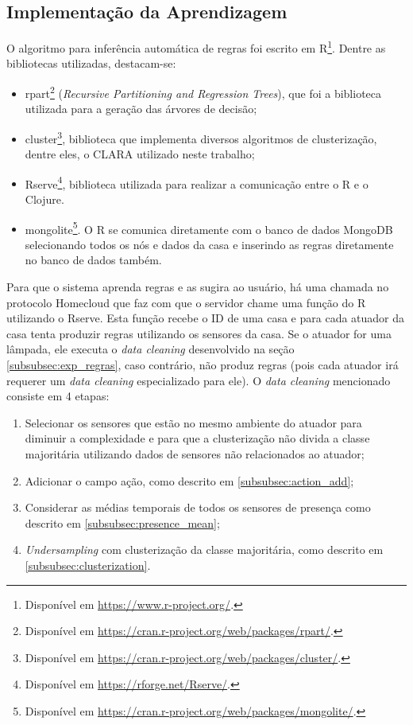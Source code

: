 \subsection{Implementação da Aprendizagem}
O algoritmo para inferência automática de regras foi escrito em R\footnote{Disponível em \url{https://www.r-project.org/}.}. Dentre as bibliotecas utilizadas, destacam-se:
\begin{itemize}
	\item rpart\footnote{Disponível em \url{https://cran.r-project.org/web/packages/rpart/}.} (\textit{Recursive Partitioning and Regression Trees}), que foi a biblioteca utilizada para a geração das árvores de decisão;
	\item cluster\footnote{Disponível em \url{https://cran.r-project.org/web/packages/cluster/}.}, biblioteca que implementa diversos algoritmos de clusterização, dentre eles, o CLARA utilizado neste trabalho;
	\item Rserve\footnote{Disponível em \url{https://rforge.net/Rserve/}.}, biblioteca utilizada para realizar a comunicação entre o R e o Clojure.
	\item mongolite\footnote{Disponível em \url{https://cran.r-project.org/web/packages/mongolite/}.}. O R se comunica diretamente com o banco de dados MongoDB selecionando todos os nós e dados da casa e inserindo as regras diretamente no banco de dados também.
\end{itemize} 

Para que o sistema aprenda regras e as sugira ao usuário, há uma chamada no protocolo Homecloud que faz com que o servidor chame uma função do R utilizando o Rserve. Esta função recebe o ID de uma casa e para cada atuador da casa tenta produzir regras utilizando os sensores da casa. Se o atuador for uma lâmpada, ele executa o \textit{data cleaning} desenvolvido na seção \ref{subsubsec:exp_regras}, caso contrário, não produz regras (pois cada atuador irá requerer um \textit{data cleaning} especializado para ele). O \textit{data cleaning} mencionado consiste em 4 etapas:
\begin{enumerate}
	\item Selecionar os sensores que estão no mesmo ambiente do atuador para diminuir a complexidade e para que a clusterização não divida a classe majoritária utilizando dados de sensores não relacionados ao atuador;
	\item Adicionar o campo ação, como descrito em \ref{subsubsec:action_add};
	\item Considerar as médias temporais de todos os sensores de presença como descrito em \ref{subsubsec:presence_mean};
	\item \textit{Undersampling} com clusterização da classe majoritária, como descrito em \ref{subsubsec:clusterization}.
\end{enumerate}

